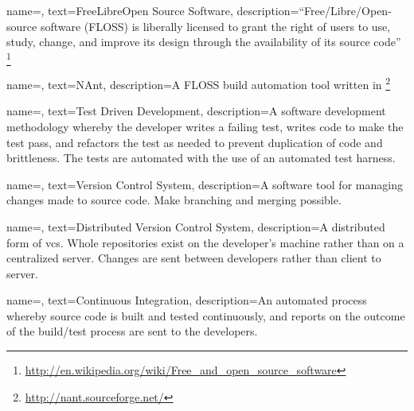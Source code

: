 
{
name=,
text=Free\/\-Libre\/\-Open Source Software,
description={``Free/\-Libre/\-Open-\-source software (FLOSS) is liberally licensed to grant the right of users to use, study, change, and improve its design through the availability of its source code'' \footnote{\url{http://en.wikipedia.org/wiki/Free_and_open_source_software}}}
}


{
name=,
text=NAnt,
description={A \gls{FLOSS} build automation tool written in \CSharp\footnote{\url{http://nant.sourceforge.net/}}}
}


{
name=,
text=Test Driven Development,
description={A software development methodology whereby the developer writes a failing test, writes code to make the test pass, and refactors the test as needed to prevent duplication of code and brittleness. The tests are automated with the use of an automated test harness.}
}
	

{
name=,
text=Version Control System,
description={A software tool for managing changes made to source code. Make \gls{branching} and \gls{merging} possible.}
}


{
name=,
text=Distributed Version Control System,
description={A distributed form of \gls{vcs}. Whole repositories exist on the developer's machine rather than on a centralized server. Changes are sent between developers rather than client to server.}
}


{
name=,
text=Continuous Integration,
description={An automated process whereby source code is built and tested continuously, and reports on the outcome of the build/test process are sent to the developers.}
}

